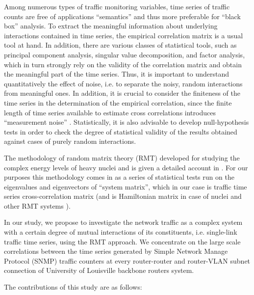 \documentclass{IEEEtran}
\begin{document}
Among numerous types of traffic monitoring variables, time series
of traffic counts are free of applications {}``semantics'' and thus
more preferable for {}``black box'' analysis. To extract the meaningful
information about underlying interactions contained in time series,
the empirical correlation matrix is a usual tool at hand. In addition,
there are various classes of statistical tools, such as principal
component analysis, singular value decomposition, and factor analysis,
which in turn strongly rely on the validity of the correlation matrix
and obtain the meaningful part of the time series. Thus, it is important
to understand quantitatively the effect of noise, i.e. to separate
the noisy, random interactions from meaningful ones. In addition,
it is crucial to consider the finiteness of the time series in the
determination of the empirical correlation, since the finite length
of time series available to estimate cross correlations introduces
{}``measurement noise'' \cite{Guhr1}. Statistically, it is also
advisable to develop null-hypothesis tests in order to check the degree
of statistical validity of the results obtained against cases of purely
random interactions.

The methodology of random matrix theory (RMT) developed for studying
the complex energy levels of heavy nuclei and is given a detailed
account in \cite{Wigner1,Dyson1,Dyson2,Mehta,Brody,Guhr3}. For our
purposes this methodology comes in as a series of statistical tests
run on the eigenvalues and eigenvectors of {}``system matrix'',
which in our case is traffic time series cross-correlation matrix
 (and is Hamiltonian matrix in case of nuclei and other RMT systems
\cite{Wigner1,Dyson1,Dyson2,Mehta,Brody,Guhr3}).

In our study, we propose to investigate the network traffic as a complex
system with a certain degree of mutual interactions of its constituents,
i.e. single-link traffic time series, using the RMT approach. We concentrate
on the large scale correlations between the time series generated
by Simple Network Manage Protocol (SNMP) traffic counters at every
router-router and router-VLAN subnet connection of University of Louisville
backbone routers system.

The contributions of this study are as follows:
\end{document}
